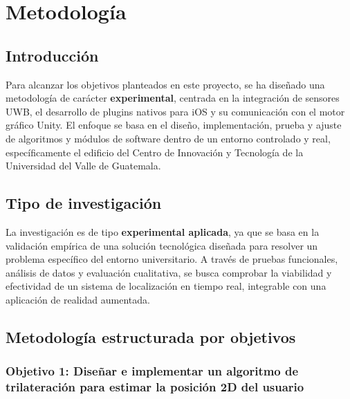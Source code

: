 \section{Metodología}
\subsection{Introducción}


Para alcanzar los objetivos planteados en este proyecto, se ha diseñado una metodología de carácter \textbf{experimental}, centrada en la integración de sensores UWB, el desarrollo de plugins nativos para iOS y su comunicación con el motor gráfico Unity. El enfoque se basa en el diseño, implementación, prueba y ajuste de algoritmos y módulos de software dentro de un entorno controlado y real, específicamente el edificio del Centro de Innovación y Tecnología de la Universidad del Valle de Guatemala.

\subsection{Tipo de investigación}

La investigación es de tipo \textbf{experimental aplicada}, ya que se basa en la validación empírica de una solución tecnológica diseñada para resolver un problema específico del entorno universitario. A través de pruebas funcionales, análisis de datos y evaluación cualitativa, se busca comprobar la viabilidad y efectividad de un sistema de localización en tiempo real, integrable con una aplicación de realidad aumentada.

\subsection{Metodología estructurada por objetivos}

\subsubsection{Objetivo 1: Diseñar e implementar un algoritmo de trilateración para estimar la posición 2D del usuario}


